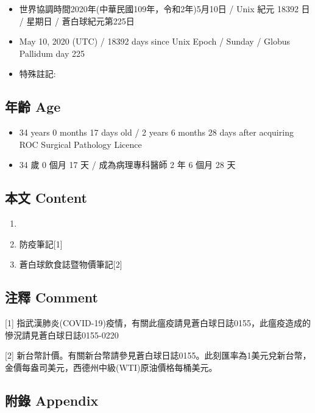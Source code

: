 \documentclass[
]{article}
\providecommand{\tightlist}{%
  \setlength{\itemsep}{0pt}\setlength{\parskip}{0pt}}
\begin{document}
\begin{itemize}
\tightlist
\item
  世界協調時間2020年(中華民國109年，令和2年)5月10日 / Unix 紀元 18392 日
  / 星期日 / 蒼白球紀元第225日
\item
  May 10, 2020 (UTC) / 18392 days since Unix Epoch / Sunday / Globus
  Pallidum day 225
\item
  特殊註記:
\end{itemize}

\hypertarget{ux5e74ux9f61-age-9}{%
\subsection{年齡 Age}\label{ux5e74ux9f61-age-9}}

\begin{itemize}
\tightlist
\item
  34 years 0 months 17 days old / 2 years 6 months 28 days after
  acquiring ROC Surgical Pathology Licence
\item
  34 歲 0 個月 17 天 / 成為病理專科醫師 2 年 6 個月 28 天
\end{itemize}

\hypertarget{ux672cux6587-content-9}{%
\subsection{本文 Content}\label{ux672cux6587-content-9}}

\begin{enumerate}
\def\labelenumi{\arabic{enumi}.}
\item
\item
  防疫筆記{[}1{]}
\item
  蒼白球飲食誌暨物價筆記{[}2{]}
\end{enumerate}

\hypertarget{ux6ce8ux91cb-comment-9}{%
\subsection{注釋 Comment}\label{ux6ce8ux91cb-comment-9}}

{[}1{]}
指武漢肺炎(COVID-19)疫情，有關此瘟疫請見蒼白球日誌0155，此瘟疫造成的慘況請見蒼白球日誌0155-0220

{[}2{]}
新台幣計價。有關新台幣請參見蒼白球日誌0155。此刻匯率為1美元兌新台幣，金價每盎司美元，西德州中級(WTI)原油價格每桶美元。

\hypertarget{ux9644ux9304-appendix-9}{%
\subsection{附錄 Appendix}\label{ux9644ux9304-appendix-9}}
\end{document}
